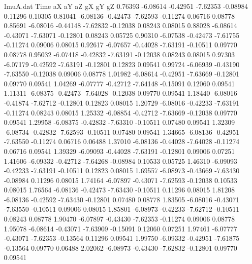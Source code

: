 \begin{filecontents}{ImuA.dat}
Time aX aY aZ gX gY gZ
   0.76393   -6.08614   -0.42951   -7.62353   -0.08984    0.11296    0.10305
   0.81041   -6.08136   -0.42473   -7.62593   -0.11274    0.06716    0.08778
   0.85691   -6.08016   -0.44148   -7.62832   -0.12038    0.08243    0.08015
   0.88028   -6.08614   -0.43071   -7.63071   -0.12801    0.08243    0.05725
   0.90310   -6.07538   -0.42473   -7.61755   -0.11274    0.09006    0.08015
   0.92617   -6.07657   -0.44028   -7.63191   -0.10511    0.09770    0.08778
   0.95032   -6.07418   -0.42832   -7.63191   -0.12038    0.08243    0.08015
   0.97303   -6.07179   -0.42592   -7.63191   -0.12801    0.12823    0.09541
   0.99724   -6.06939   -0.43190   -7.63550   -0.12038    0.09006    0.08778
   1.01982   -6.08614   -0.42951   -7.63669   -0.12801    0.09770    0.09541
   1.04269   -6.07777   -0.42712   -7.64148   -0.15091    0.12060    0.09541
   1.11311   -6.08375   -0.42473   -7.64028   -0.12038    0.09770    0.09541
   1.18440   -6.08016   -0.41874   -7.62712   -0.12801    0.12823    0.08015
   1.20729   -6.08016   -0.42233   -7.63191   -0.11274    0.08243    0.08015
   1.25332   -6.08854   -0.42712   -7.63669   -0.12038    0.09770    0.09541
   1.29958   -6.08375   -0.42832   -7.63310   -0.10511    0.07480    0.09541
   1.32309   -6.08734   -0.42832   -7.62593   -0.10511    0.07480    0.09541
   1.34665   -6.08136   -0.42951   -7.63550   -0.11274    0.06716    0.06488
   1.37010   -6.08136   -0.44028   -7.64028   -0.11274    0.06716    0.09541
   1.39329   -6.09093   -0.44028   -7.63191   -0.12801    0.09006    0.07251
   1.41606   -6.09332   -0.42712   -7.64268   -0.08984    0.10533    0.05725
   1.46310   -6.09093   -0.42233   -7.63191   -0.10511    0.12823    0.08015
   1.69557   -6.08973   -0.43669   -7.63430   -0.08984    0.11296    0.08015
   1.74164   -6.07897   -0.43071   -7.62593   -0.12038    0.10533    0.08015
   1.76564   -6.08136   -0.42473   -7.63430   -0.10511    0.11296    0.08015
   1.81208   -6.08136   -0.42592   -7.63430   -0.12801    0.07480    0.08778
   1.83505   -6.08016   -0.43071   -7.63550   -0.10511    0.09006    0.08015
   1.85801   -6.08973   -0.42233   -7.62712   -0.10511    0.08243    0.08778
   1.90470   -6.07897   -0.43430   -7.62353   -0.11274    0.09006    0.08778
   1.95078   -6.08614   -0.43071   -7.63909   -0.15091    0.12060    0.07251
   1.97461   -6.07777   -0.43071   -7.62353   -0.13564    0.11296    0.09541
   1.99750   -6.09332   -0.42951   -7.61875   -0.13564    0.09770    0.06488
   2.02062   -6.08973   -0.43430   -7.62832   -0.12801    0.09770    0.09541

\end{filecontents}
